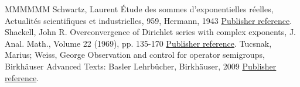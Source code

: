 \documentclass[11pt]{article}
\theoremstyle{definition}
\numberwithin{equation}{section}
\numberwithin{figure}{section}
\numberwithin{table}{section}
\begin{document}
\begin{thebibliography}{MMMMMM}
 Schwartz, Laurent Étude des sommes d’exponentielles réelles, Actualités scientifiques et industrielles, 959, Hermann, 1943 \href{https://ahl.centre-mersenne.org/item/AHL_2020__3__717_0/#SchwartzThese}{Publisher reference}.
 Shackell, John R. Overconvergence of Dirichlet series with complex exponents, J. Anal. Math., Volume 22 (1969), pp. 135-170 \href{https://ahl.centre-mersenne.org/item/AHL_2020__3__717_0/#Shackell69}{Publisher reference}.
 Tucsnak, Marius; Weiss, George Observation and control for operator semigroups, Birkhäuser Advanced Texts: Basler Lehrbücher, Birkhäuser, 2009 \href{https://ahl.centre-mersenne.org/item/AHL_2020__3__717_0/#TucsnakWeissBook}{Publisher reference}.
\end{thebibliography}
\end{document}
